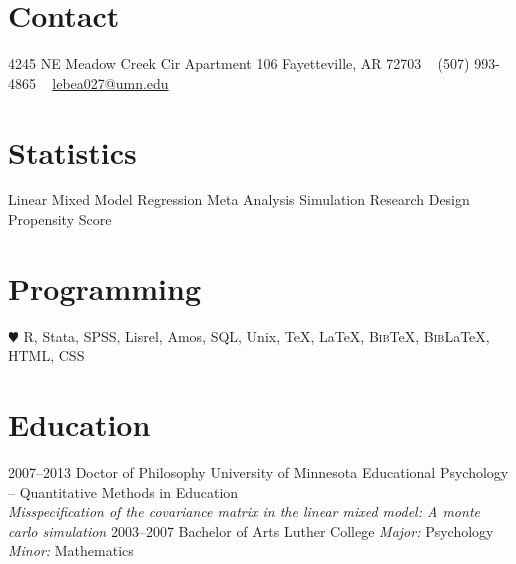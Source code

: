 \documentclass[]{friggeri-cv} %
\begin{document}


\begin{aside} %
\section{Contact}
4245 NE Meadow Creek Cir
Apartment 106
Fayetteville, AR 72703
~
(507) 993-4865
~
\href{mailto:lebea027@umn.edu}{lebea027@umn.edu}

\section{Statistics}
Linear Mixed Model
Regression
Meta Analysis
Simulation
Research Design
Propensity Score

\section{Programming}
{\color{green} $\varheartsuit$} R, Stata, SPSS, 
Lisrel, Amos, SQL, 
Unix, \TeX{}, \LaTeX{}, 
B\textsc{ib}\TeX{}, B\textsc{ib}\LaTeX{},
HTML, CSS
\end{aside}


\section{Education}

\begin{entrylist}
\entry
{2007--2013}
{Doctor {\normalfont of Philosophy}}
{University of Minnesota}
{Educational Psychology -- Quantitative Methods in Education \\ \emph{Misspecification of the covariance matrix in the linear mixed model: A monte carlo simulation}} %
\entry
{2003--2007}
{Bachelor {\normalfont of Arts}}
{Luther College}
{\emph{Major:} Psychology \\ \emph{Minor:} Mathematics}
\end{entrylist}
\end{document}
